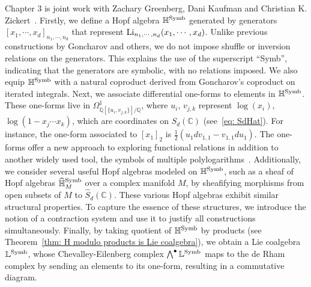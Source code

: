 
Chapter 3 is joint work with Zachary Greenberg, Dani Kaufman and Christian K. Zickert~\cite{ZDHZ_TheLieCoalgebraOfMultiplePolylogarithms}. Firstly, we define a Hopf algebra $\mathbb H^{\operatorname{Symb}}$ generated by generators $[x_1,\cdots,x_d]_{n_1,\cdots,n_d}$ that represent $\operatorname{Li}_{n_1,\cdots,n_d}(x_1,\cdots,x_d)$. Unlike previous constructions by Goncharov and others, we do not impose shuffle or inversion relations on the generators. This explains the use of the superscript ``Symb'', indicating that the generators are symbolic, with no relations imposed. We also equip $\mathbb H^{\operatorname{Symb}}$ with a natural coproduct derived from Goncharov's coproduct on iterated integrals. Next, we associate differential one-forms to elements in $\mathbb H^{\operatorname{Symb}}$. These one-forms live in $\Omega^1_{\mathbb Q[\{u_i,v_{j,k}\}]/\mathbb Q}$, where $u_i$, $v_{j,k}$ represent $\log(x_i)$, $\log(1-x_j\cdots x_k)$, which are coordinates on $\widehat{S}_d(\mathbb C)$ (see~\eqref{eq: SdHat}). For instance, the one-form associated to $[x_1]_2$ is $\frac{1}{2}(u_1dv_{1,1}-v_{1,1}du_1)$. The one-forms offer a new approach to exploring functional relations in addition to another widely used tool, the symbols of multiple polylogarithms~\cite{CharltonDuhrGangl_SingleValuedPolylogs}. Additionally, we consider several useful Hopf algebras modeled on $\mathbb H^{\operatorname{Symb}}$, such as a sheaf of Hopf algebras $\widehat{\mathbb H}^{\operatorname{Symb}}_M$ over a complex manifold $M$, by sheafifying morphisms from open subsets of $M$ to $\widehat S_d(\mathbb C)$. These various Hopf algebras exhibit similar structural properties. To capture the essence of these structures, we introduce the notion of a contraction system and use it to justify all constructions simultaneously. Finally, by taking quotient of $\mathbb H^{\operatorname{Symb}}$ by products (see Theorem~\ref{thm: H modulo products is Lie coalgebra}), we obtain a Lie coalgebra $\mathbb L^{\operatorname{Symb}}$, whose Chevalley-Eilenberg complex $\bigwedge^\bullet\mathbb L^{\operatorname{Symb}}$ maps to the de Rham complex by sending an elements to its one-form, resulting in a commutative diagram.

